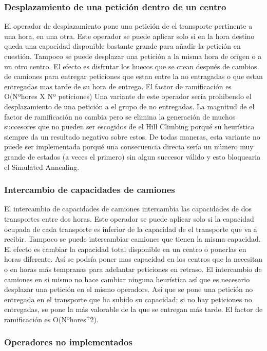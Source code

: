 \documentclass{article}
\begin{document}
\subsubsection{Desplazamiento de una petición dentro de un centro}
El operador de desplazamiento pone una petición de el transporte pertinente a una hora, en una otra. Este operador se puede aplicar solo si en la hora destino queda una capacidad disponible bastante grande para añadir la petición en cuestión. Tampoco se puede desplazar una petición a la misma hora de orígen o a un otro centro.
El efecto es disfrutar los huecos que se crean después de cambios de camiones para entregar peticiones que estan entre la no entragadas o que estan entregadas mas tarde de su hora de entrega.
El factor de ramificación es O(Nºhores X Nº peticiones) 
Una variante de este operador sería prohibendo el desplazamiento de una petición a el grupo de no entregadas. La magnitud de el factor de ramificación no cambia pero se elimina la generación de muchos succesores que no pueden ser escogidos de el Hill Climbing porqué su heurística siempre da un resultado negativo sobre estos. De todas maneras, esta variante no puede ser implementada porqué una consecuencia directa sería un número muy grande de estados (a veces el primero) sin algun succesor válido y esto bloquearia el Simulated Annealing. 
\subsubsection{Intercambio de capacidades de camiones}
El intercambio de capacidades de camiones intercambia las capacidades de dos transportes entre dos horas. Este operador se puede aplicar solo si la capacidad ocupada de cada transporte es inferior de la capacidad de el transporte que va a recibir. Tampoco se puede intercambiar camiones que tienen la misma capacidad. El efecto es cambiar la capacidad total disponible en un centro o ponerlas en horas diferente. Así se podría poner mas capacidad en los centros que la necesitan o en horas más tempranas para adelantar peticiones en retraso. 
El intercambio de camiones en si mismo no hace cambiar ninguna heurística así que es necesario desplazar una petición en el mismo operadors. Así que se pone una petición no entregada en el transporte que ha subido su capacidad; si no hay peticiones no entregadas, se pone la más valorable de la que se entregan más tarde.
El factor de ramificación es O(Nºhores^2).
\subsubsection{Operadores no implementados}
\end{document}
